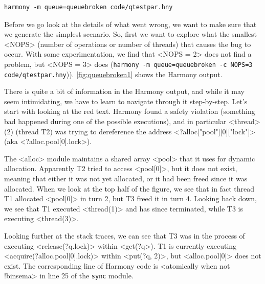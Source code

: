 \documentclass{report}
\newenvironment{code}{
\tcolorbox
}{
\endtcolorbox
}
\begin{document}
\begin{code}
\begin{verbatim}
harmony -m queue=queuebroken code/qtestpar.hny
\end{verbatim}
\end{code}

Before we go look at the details of what went wrong, we want to make
sure that we generate the simplest scenario.  So, first we want to explore
what the smallest <{NOPS}> (number of operations or number of
threads) that causes the bug to occur.  With some experimentation,
we find that <{NOPS = 2}> does not find a problem, but
<{NOPS = 3}> does
(\texttt{harmony -m queue=queuebroken -c NOPS=3 code/qtestpar.hny})).
\autoref{fig:queuebroken1} shows the Harmony output.

There is quite a bit of information in the Harmony output, and while
it may seem intimidating, we have to learn to navigate through it
step-by-step.
Let's start with looking at the red text.  Harmony found a safety
violation (something bad happened during one of the possible executions),
and in particular <{thread}>(2) (thread T2) was trying to dereference
the address <{?alloc["pool"][0]["lock"]}> (aka <{?alloc.pool[0].lock}>).

The <{alloc}> module maintains a shared array <{pool}> that
it uses for dynamic allocation.  Apparently T2 tried to access
<{pool[0]}>, but it does not exist, meaning that either it was not
yet allocated, or it had been freed since it was allocated.
When we look at the top half of the figure, we see that in fact thread
T1 allocated <{pool[0]}> in turn 2, but T3 freed it in turn 4.
Looking back down, we see that T1 executed <{thread(1)}> and has
since terminated, while T3 is executing <{thread(3)}>.

Looking further at the stack traces, we can see that
T3 was in the process of executing
<{release(?q.lock)}> within <{get(?q}>).
T1 is currently executing <{acquire(?alloc.pool[0].lock)}>
within <{put(?q, 2)}>, but 
<{alloc.pool[0]}> does not exist.
The corresponding line of Harmony code is
<{atomically when not !binsema}>
in line 25 of the \texttt{sync} module.
\end{document}

